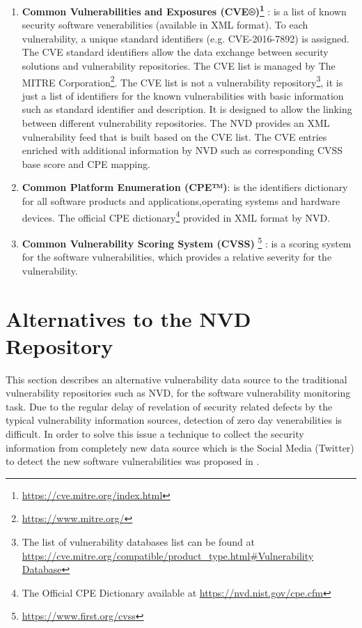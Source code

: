 \documentclass{llncs}
\begin{document}
 \begin{enumerate}
 \item \textbf{Common Vulnerabilities and Exposures (CVE®)\footnote{\url{https://cve.mitre.org/index.html}}} : is a list of known security software venerabilities (available in XML format). To each vulnerability, a unique standard identifiers (e.g. CVE-2016-7892) is assigned. The CVE standard identifiers allow the data exchange between security solutions and vulnerability repositories. The CVE list is managed by The MITRE Corporation\footnote{\url{https://www.mitre.org/}}.
 \newpage
 The CVE list is not a vulnerability repository\footnote{The list of vulnerability databases list can be found at \url{https://cve.mitre.org/compatible/product_type.html\#Vulnerability Database}}, it is just a list of identifiers for the known vulnerabilities with basic information such as standard identifier and description. It is designed to allow the linking between different vulnerability repositories. The NVD provides an XML vulnerability feed that is built based on the CVE list. The CVE entries enriched with additional information by NVD such as corresponding CVSS base score and CPE mapping.    
 
 \item \textbf{Common Platform Enumeration (CPE™)}: is the identifiers dictionary for all software products and applications,operating systems and hardware devices. The official CPE dictionary\footnote{The Official CPE Dictionary available at \url{https://nvd.nist.gov/cpe.cfm}} provided in XML format by NVD.
  
 \item \textbf{Common Vulnerability Scoring System (CVSS)} \footnote{\url{https://www.first.org/cvss}} : is a scoring system for the software  vulnerabilities, which provides a relative severity for the vulnerability.
 \end{enumerate}
 

\section{Alternatives to the NVD Repository}

\par This section describes an alternative vulnerability data source to the traditional vulnerability repositories such as NVD, for the software vulnerability monitoring task. Due to the regular delay of revelation of security related defects by the typical vulnerability information sources,  detection of zero day venerabilities is difficult.  In order to solve this issue a technique to collect the security information from completely new data source which is the Social Media (Twitter) to detect the new software vulnerabilities was proposed in \cite{paper2}.
\end{document}
